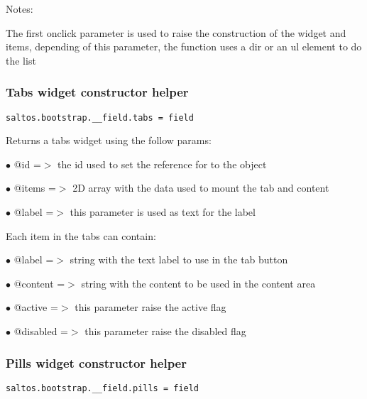 \documentclass[a4paper]{article}
\begin{document}
Notes:

The first onclick parameter is used to raise the construction of the widget and items,
depending of this parameter, the function uses a dir or an ul element to do the list

\hypertarget{toc645}{}
\subsubsection{Tabs widget constructor helper}

\begin{lstlisting}
saltos.bootstrap.__field.tabs = field
\end{lstlisting}

Returns a tabs widget using the follow params:

\begin{compactitem}
\item[\color{myblue}$\bullet$] @id    =$>$ the id used to set the reference for to the object
\item[\color{myblue}$\bullet$] @items =$>$ 2D array with the data used to mount the tab and content
\item[\color{myblue}$\bullet$] @label    =$>$ this parameter is used as text for the label
\end{compactitem}

Each item in the tabs can contain:

\begin{compactitem}
\item[\color{myblue}$\bullet$] @label    =$>$ string with the text label to use in the tab button
\item[\color{myblue}$\bullet$] @content  =$>$ string with the content to be used in the content area
\item[\color{myblue}$\bullet$] @active   =$>$ this parameter raise the active flag
\item[\color{myblue}$\bullet$] @disabled =$>$ this parameter raise the disabled flag
\end{compactitem}

\hypertarget{toc646}{}
\subsubsection{Pills widget constructor helper}

\begin{lstlisting}
saltos.bootstrap.__field.pills = field
\end{lstlisting}
\end{document}

